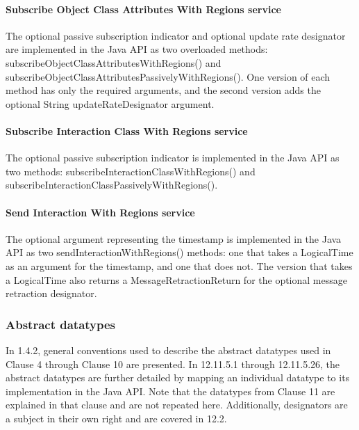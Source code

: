 \begin{compactstdpage}
    \paragraph{Subscribe Object Class Attributes With Regions service}

    The optional passive subscription indicator and optional update rate designator are implemented in the Java API as two overloaded methods: subscribeObjectClassAttributesWithRegions() and subscribeObjectClassAttributesPassivelyWithRegions(). One version of each method has only the required arguments, and the second version adds the optional String updateRateDesignator argument.

    \paragraph{Subscribe Interaction Class With Regions service}

    The optional passive subscription indicator is implemented in the Java API as two methods: subscribeInteractionClassWithRegions()               and subscribeInteractionClassPassivelyWithRegions().

    \paragraph{Send Interaction With Regions service}

    The optional argument representing the timestamp is implemented in the Java API as two sendInteractionWithRegions() methods: one that takes a LogicalTime as an argument for the timestamp, and one that does not. The version that takes a LogicalTime also returns a MessageRetractionReturn for the optional message retraction designator.

    \subsubsection{Abstract datatypes}

    In 1.4.2, general conventions used to describe the abstract datatypes used in Clause 4 through Clause 10 are presented. In 12.11.5.1 through 12.11.5.26, the abstract datatypes are further detailed by mapping an individual datatype to its implementation in the Java API. Note that the datatypes from Clause 11 are explained in that clause and are not repeated here. Additionally, designators are a subject in their own right and are covered in 12.2.


\end{compactstdpage}

